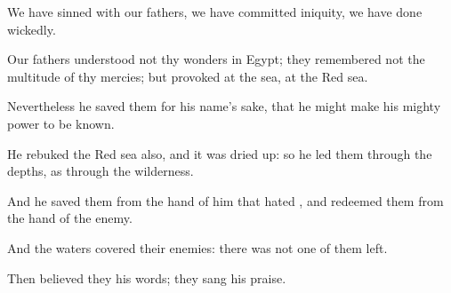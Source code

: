 {\Q {}We have
sinned with our
fathers, we have committed
iniquity, we have done
wickedly.


\par }{\Q {}Our
fathers
understood not thy
wonders in
Egypt; they
remembered not the
multitude of thy
mercies; but
provoked
{} at the
sea,
{} at the
Red
sea.


\par }{\Q {}Nevertheless he
saved them for his
name’s sake, that he might make his mighty
power to be
known.


\par }{\Q {}He
rebuked the
Red
sea also, and it was dried
up: so he
led them through the
depths, as through the
wilderness.


\par }{\Q {}And he
saved them from the
hand of him that
hated
{}, and
redeemed them from the
hand of the
enemy.


\par }{\Q {}And the
waters
covered their
enemies: there was not
one of them
left.


\par }{\Q {}Then
believed they his
words; they
sang his
praise.


\par }{\BB \par }
